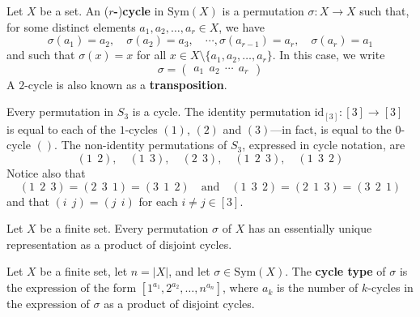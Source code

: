 \todo{}

\begin{definition}
\label{defCycle}
Let $X$ be a set. An (\textbf{$r$-})\textbf{cycle} in $\mathrm{Sym}(X)$ is a permutation $\sigma : X \to X$ such that, for some distinct elements $a_1,a_2,\dots,a_r \in X$, we have
\[ \sigma(a_1) = a_2, \quad \sigma(a_2) = a_3, \quad \cdots, \sigma(a_{r-1}) = a_r, \quad \sigma(a_r) = a_1 \]
and such that $\sigma(x) = x$ for all $x \in X \setminus \{ a_1, a_2, \dots, a_r \}$. In this case, we write
\[ \sigma = \begin{pmatrix} a_1 ~~ a_2 ~~ \cdots ~~ a_r \end{pmatrix} \]
A $2$-cycle is also known as a \textbf{transposition}.
\end{definition}

\begin{example}
Every permutation in $S_3$ is a cycle. The identity permutation $\mathrm{id}_{[3]} : [3] \to [3]$ is equal to each of the $1$-cycles $(1)$, $(2)$ and $(3)$---in fact, is equal to the $0$-cycle $()$. The non-identity permutations of $S_3$, expressed in cycle notation, are
\[ (1 ~~ 2), \quad (1 ~~ 3), \quad (2 ~~ 3), \quad (1 ~~ 2 ~~ 3), \quad (1 ~~ 3 ~~ 2) \]
Notice also that
\[ (1 ~~ 2 ~~ 3) = (2 ~~ 3 ~~ 1) = (3 ~~ 1 ~~ 2) \quad \text{and} \quad (1 ~~ 3 ~~ 2) = (2 ~~ 1 ~~ 3) = (3 ~~ 2 ~~ 1) \]
and that $(i ~~ j) = (j ~~ i)$ for each $i \ne j \in [3]$.
\end{example}

\todo{}

\begin{theorem}
\label{thmCycleRepresentation}
Let $X$ be a finite set. Every permutation $\sigma$ of $X$ has an essentially unique representation as a product of disjoint cycles.
\end{theorem}

\begin{cproof}

\end{cproof}

\todo{}

\begin{definition}
\label{defCycleType}
Let $X$ be a finite set, let $n = |X|$, and let $\sigma \in \mathrm{Sym}(X)$. The \textbf{cycle type} of $\sigma$ is the expression of the form $[1^{a_1}, 2^{a_2}, \dots, n^{a_n}]$, where $a_k$ is the number of $k$-cycles in the expression of $\sigma$ as a product of disjoint cycles.
\end{definition}

